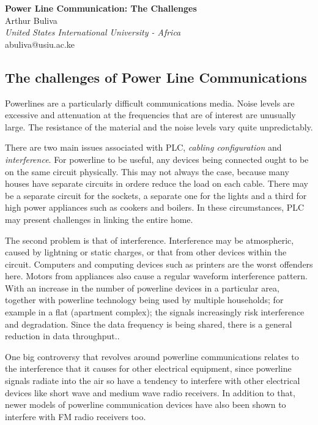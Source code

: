 \documentclass[11pt]{article}
\begin{document}
\noindent
\begin{center}
\textbf{
{\huge Power Line Communication: The Challenges}
}\\
\vspace{0.2in}
Arthur Buliva\\
\emph{United States International University - Africa}\\
abuliva@usiu.ac.ke
\end{center}



\begin{multicols}{2}

\section*{The challenges of Power Line Communications}
Powerlines are a particularly difficult communications media. Noise levels are excessive and attenuation at the frequencies that are of interest are unusually large. The resistance of the material and the noise levels vary quite unpredictably. 

There are two main issues associated with PLC, \emph{cabling configuration} and \emph{interference}. For powerline to be useful, any devices being connected ought to be on the same circuit physically. This may not always the case, because many houses have separate circuits  in ordere reduce the load on each cable. There may be a separate circuit for the sockets, a separate one for the lights and a third for high power appliances such as cookers and boilers. In these circumstances, PLC may present challenges in linking the entire home.

The second problem is that of interference. Interference may be atmospheric, caused by lightning or static charges, or that from other devices within the circuit. Computers and computing devices such as printers are the worst offenders here. Motors from appliances also cause a regular waveform interference pattern. With an increase in the number of powerline devices in a particular area, together with powerline technology being used by multiple households; for example in a flat (apartment complex); the signals increasingly risk interference and degradation. Since the data frequency is being shared, there is a general reduction in data throughput..

One big controversy that revolves around powerline communications relates to the interference that it causes for other electrical equipment, since powerline signals radiate into the air so have a tendency to interfere with other electrical devices like short wave and medium wave radio receivers. In addition to that, newer models of powerline communication devices have also been shown to interfere with FM radio receivers too.


\end{multicols}
\end{document}
